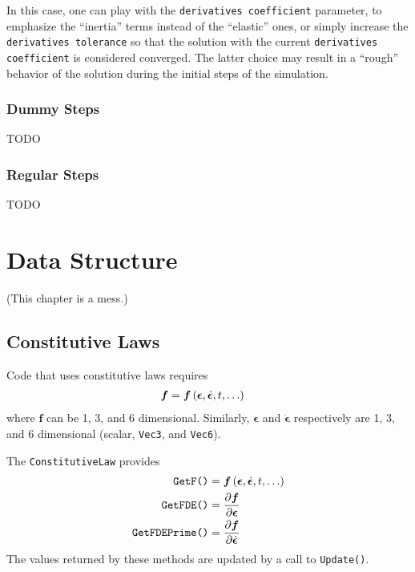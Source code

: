 \documentclass[10pt,dvips,fleqn,subeqn]{report}
\newcommand{\T}[1]{\bm{#1}}
\begin{document}
In this case, one can play with the \texttt{derivatives coefficient}
parameter, to emphasize the ``inertia'' terms instead of the ``elastic'' ones,
or simply increase the \texttt{derivatives tolerance} so that the solution
with the current \texttt{derivatives coefficient} is considered converged.
The latter choice may result in a ``rough'' behavior of the solution
during the initial steps of the simulation.



\subsection{Dummy Steps}
TODO

\subsection{Regular Steps}
TODO






\chapter{Data Structure}
(This chapter is a mess.)


\section{Constitutive Laws}
Code that uses constitutive laws requires
\begin{align}
	\T{f}
	&=
	\T{f}\plbr{ \T{\epsilon}, \dot{\T{\epsilon}}, t, \ldots }
\end{align}
where $\T{f}$ can be 1, 3, and 6 dimensional.
Similarly, $\T{\epsilon}$ and $\dot{\T{\epsilon}}$
respectively are 1, 3, and 6 dimensional
(scalar, \texttt{Vec3}, and \texttt{Vec6}).

The \texttt{ConstitutiveLaw} provides
\begin{subequations}
\begin{align}
	\texttt{GetF()}
	&=
	\T{f}\plbr{ \T{\epsilon}, \dot{\T{\epsilon}}, t, \ldots }
	\\
	\texttt{GetFDE()}
	&=
	\frac{\partial \T{f}}{\partial \T{\epsilon}}
	\\
	\texttt{GetFDEPrime()}
	&=
	\frac{\partial \T{f}}{\partial \dot{\T{\epsilon}}}
\end{align}
\end{subequations}
The values returned by these methods are updated by a call to
\texttt{Update()}.
\end{document}
